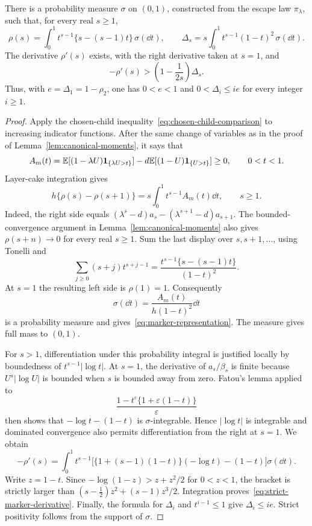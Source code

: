 \begin{lemma}\label{lem:canonical-marker}
There is a probability measure $\sigma$ on $(0,1)$, constructed from the
escape law $\pi_\lambda$, such that, for every real $s\ge1$,
\begin{equation}\label{eq:marker-representation}
 \rho(s)=\int_0^1 t^{s-1}\{s-(s-1)t\}\,\sigma(\dd t),
 \qquad
 \Delta_s=s\int_0^1 t^{s-1}(1-t)^2\,\sigma(\dd t).
\end{equation}
The derivative $\rho'(s)$ exists, with the right derivative taken at $s=1$,
and
\begin{equation}\label{eq:strict-marker-derivative}
 -\rho'(s)>\left(1-\frac1{2s}\right)\Delta_s.
\end{equation}
Thus, with $e=\Delta_1=1-\rho_2$, one has $0<e<1$ and
$0<\Delta_i\le i e$ for every integer $i\ge1$.
\end{lemma}
\begin{proof}
Apply the chosen-child inequality~\eqref{eq:chosen-child-comparison} to
increasing indicator functions.  After the same change of variables as
in the proof of Lemma~\ref{lem:canonical-moments}, it says that
\[
 A_m(t)=\mathbb E[(1-\lambda U)\mathbf1_{\{\lambda U>t\}}]
       -d\mathbb E[(1-U)\mathbf1_{\{U>t\}}]\ge0,
 \qquad 0<t<1.
\]
Layer-cake integration gives
\[
 h\{\rho(s)-\rho(s+1)\}=s\int_0^1t^{s-1}A_m(t)\dd t,
 \qquad s\ge1.
\]
Indeed, the right side equals
$(\lambda^s-d)a_s-(\lambda^{s+1}-d)a_{s+1}$.
The bounded-convergence argument in Lemma~\ref{lem:canonical-moments}
also gives $\rho(s+n)\to0$ for every real $s\ge1$.  Sum the last
display over $s,s+1,\ldots$, using Tonelli and
\[
 \sum_{j\ge0}(s+j)t^{s+j-1}
 =\frac{t^{s-1}\{s-(s-1)t\}}{(1-t)^2}.
\]
At $s=1$ the resulting left side is $\rho(1)=1$. Consequently
\[
 \sigma(\dd t)=\frac{A_m(t)}{h(1-t)^2}\dd t
\]
is a probability measure and gives~\eqref{eq:marker-representation}.
The measure gives full mass to $(0,1)$.

For $s>1$, differentiation under this probability integral is justified
locally by boundedness of $t^{s-1}|\log t|$.  At $s=1$, the derivative
of $a_s/\beta_s$ is finite because $U^s|\log U|$ is bounded when $s$
is bounded away from zero.  Fatou's lemma applied to
\[
 \frac{1-t^{\varepsilon}\{1+\varepsilon(1-t)\}}{\varepsilon}
\]
then shows that $-\log t-(1-t)$ is $\sigma$-integrable.  Hence
$|\log t|$ is integrable and dominated convergence also permits
differentiation from the right at $s=1$. We obtain
\[
 -\rho'(s)=\int_0^1 t^{s-1}
 \bigl[\{1+(s-1)(1-t)\}(-\log t)-(1-t)\bigr]\sigma(\dd t).
\]
Write $z=1-t$.  Since $-\log(1-z)>z+z^2/2$ for $0<z<1$, the
bracket is strictly larger than
$(s-\tfrac12)z^2+(s-1)z^3/2$.
Integration proves~\eqref{eq:strict-marker-derivative}.  Finally,
the formula for $\Delta_i$ and $t^{i-1}\le1$ give $\Delta_i\le i e$.
Strict positivity follows from the support of $\sigma$.
\end{proof}

